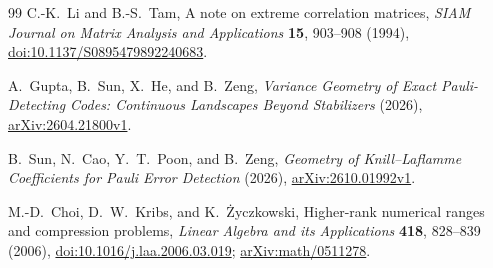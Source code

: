 \documentclass[11pt]{article}
\theoremstyle{remark}
\numberwithin{equation}{section}
\begin{document}
\begin{thebibliography}{99}
C.-K.~Li and B.-S.~Tam, A note on extreme correlation matrices,
\emph{SIAM Journal on Matrix Analysis and Applications} \textbf{15},
903--908 (1994),
\href{https://doi.org/10.1137/S0895479892240683}{doi:10.1137/S0895479892240683}.

A.~Gupta, B.~Sun, X.~He, and B.~Zeng,
\emph{Variance Geometry of Exact Pauli-Detecting Codes:
Continuous Landscapes Beyond Stabilizers} (2026),
\href{https://arxiv.org/abs/2604.21800v1}{arXiv:2604.21800v1}.

B.~Sun, N.~Cao, Y.~T.~Poon, and B.~Zeng,
\emph{Geometry of Knill--Laflamme Coefficients for Pauli Error Detection}
(2026), \href{https://arxiv.org/abs/2610.01992v1}{arXiv:2610.01992v1}.

M.-D.~Choi, D.~W.~Kribs, and K.~\.{Z}yczkowski,
Higher-rank numerical ranges and compression problems,
\emph{Linear Algebra and its Applications} \textbf{418}, 828--839 (2006),
\href{https://doi.org/10.1016/j.laa.2006.03.019}{doi:10.1016/j.laa.2006.03.019};
\href{https://arxiv.org/abs/math/0511278}{arXiv:math/0511278}.
\end{thebibliography}
\end{document}
